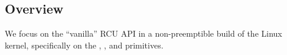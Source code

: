 \subsection{Overview}
%
%
%
We focus on the ``vanilla'' RCU API in a non-preemptible build of
the Linux kernel, specifically on the ,
, and  primitives.
%

